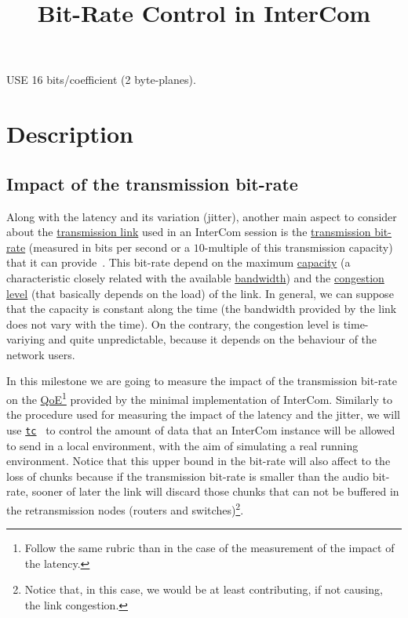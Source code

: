 \title{Bit-Rate Control in InterCom}

USE 16 bits/coefficient (2 byte-planes).

\maketitle

\section{Description}
\subsection{Impact of the transmission bit-rate}
Along with the latency and its variation (jitter), another main aspect
to consider about the
\href{https://en.wikipedia.org/wiki/Telecommunications_link}{transmission
  link} used in an InterCom session is the
\href{https://en.wikipedia.org/wiki/Bit_rate}{transmission bit-rate}
(measured in bits per second or a $10$-multiple of this transmission
capacity) that it can provide~\cite{Forouzan,Tanenbaum}. This bit-rate
depend on the maximum
\href{https://en.wikipedia.org/wiki/Bandwidth_(computing)}{capacity}
(a characteristic closely related with the available
\href{https://en.wikipedia.org/wiki/Bandwidth_(signal_processing)}{bandwidth})
and the
\href{https://en.wikipedia.org/wiki/Network_congestion}{congestion
  level} (that basically depends on the load) of the link. In general,
we can suppose that the capacity is constant along the time (the
bandwidth provided by the link does not vary with the time). On the
contrary, the congestion level is time-variying and quite
unpredictable, because it depends on the behaviour of the network
users.

In this milestone we are going to measure the impact of the
transmission bit-rate on the
\href{https://en.wikipedia.org/wiki/Quality_of_experience}{QoE}\footnote{Follow
  the same rubric than in the case of the measurement of the impact of
  the latency.} provided by the minimal implementation of InterCom. Similarly to the procedure used for measuring the impact of
the latency and the jitter, we will use
\href{https://man7.org/linux/man-pages/man8/tc.8.html}{\texttt{tc}}~\cite{bert2012lartc}
to control the amount of data that an InterCom instance will be
allowed to send in a local environment, with the aim of simulating a
real running environment. Notice that this upper bound in the bit-rate
will also affect to the loss of chunks because if the transmission
bit-rate is smaller than the audio bit-rate, sooner of later the link
will discard those chunks that can not be buffered in the retransmission
nodes (routers and switches)\footnote{Notice that, in this case, we
would be at least contributing, if not causing, the link congestion.}.

